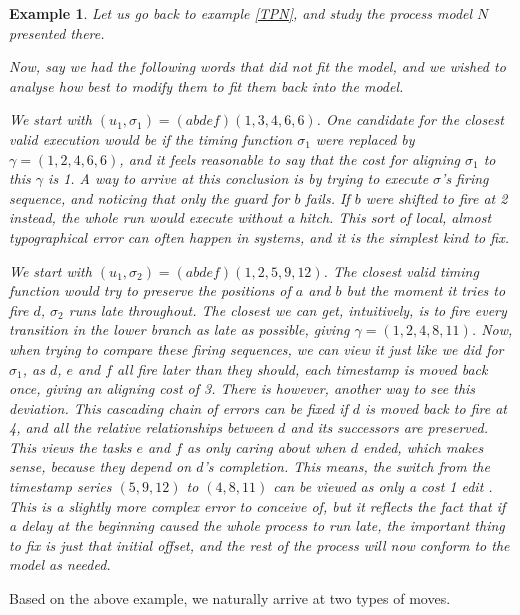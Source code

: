 \documentclass[conference]{IEEEtran}
\newtheorem{example}{Example}
\begin{document}
	\begin{example}
		Let us go back to example \ref{TPN}, and study the process model $N$ presented there. 
		
		Now, say we had the following words that did not fit the model, and we wished to analyse how best to modify them to fit them back into the model. 
		
		We start with $(u_1, \sigma_1) = (abdef)(1, 3, 4, 6, 6)$. 
		One candidate for the closest valid execution would be if the timing function $\sigma_1$ were replaced by $\gamma = (1, 2, 4, 6, 6)$, and it feels reasonable to say that the cost for aligning $\sigma_1$ to this $\gamma$ is 1. 
		A way to arrive at this conclusion is by trying to execute $\sigma$'s firing sequence, and noticing that only the guard for $b$ fails. If $b$ were shifted to fire at 2 instead, the whole run would execute without a hitch. This sort of local, almost typographical error can often happen in systems, and it is the simplest kind to fix.  
		
		We start with $(u_1, \sigma_2) = (abdef)(1, 2, 5, 9, 12)$. 
		The closest valid timing function would try to preserve the positions of $a$ and $b$ but the moment it tries to fire $d$, $\sigma_2$ runs late throughout. The closest we can get, intuitively, is to fire every transition in the lower branch as late as possible, giving $\gamma = (1, 2, 4, 8, 11)$. 
		Now, when trying to compare these firing sequences, we can view it just like we did for $\sigma_1$, as $d$, $e$ and $f$ all fire later than they should, each timestamp is moved back once, giving an aligning cost of 3. 
		There is however, another way to see this deviation. 
		This cascading chain of errors can be fixed if $d$ is moved back to fire at 4, and all the relative relationships between $d$ and its successors are preserved. 
		This views the tasks $e$ and $f$ as only caring about when $d$ ended, which makes sense, because they depend on $d$'s completion. 
		This means, the switch from the timestamp series $(5,9,12)$ to $(4, 8, 11)$ can be viewed as only a cost 1 edit
		. 
		This is a slightly more complex error to conceive of, but it reflects the fact that if a delay at the beginning caused the whole process to run late, the important thing to fix is just that initial offset, and the rest of the process will now conform to the model as needed. 
	\end{example}
	
	Based on the above example, we naturally arrive at two types of moves. 
	
\end{document}
